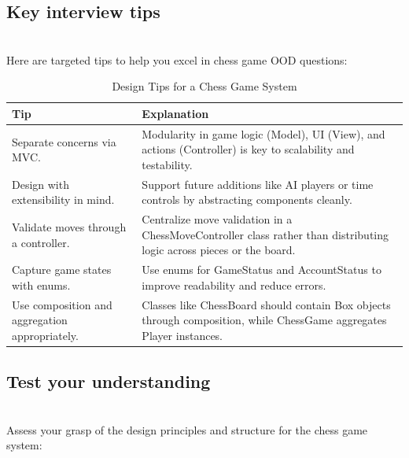 \subsection{Key interview tips}\label{bEdl363Nu32rcrsxAInjh}
\\
Here are targeted tips to help you excel in chess game OOD questions:

\begin{table}[h!]
\centering
\begin{tabular}{|p{6cm}|p{9cm}|}
\hline
\textbf{Tip} & \textbf{Explanation} \\
\hline
Separate concerns via MVC. & 
Modularity in game logic (Model), UI (View), and actions (Controller) is key to scalability and testability. \\
\hline
Design with extensibility in mind. & 
Support future additions like AI players or time controls by abstracting components cleanly. \\
\hline
Validate moves through a controller. & 
Centralize move validation in a ChessMoveController class rather than distributing logic across pieces or the board. \\
\hline
Capture game states with enums. & 
Use enums for GameStatus and AccountStatus to improve readability and reduce errors. \\
\hline
Use composition and aggregation appropriately. & 
Classes like ChessBoard should contain Box objects through composition, while ChessGame aggregates Player instances. \\
\hline
\end{tabular}
\caption{Design Tips for a Chess Game System}
\label{tab:chess_design_tips}
\end{table}


\subsection{Test your understanding}\label{UwLrF1kbKkIQSK9MhW06k}
\\
Assess your grasp of the design principles and structure for the chess game system:

